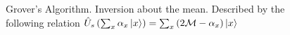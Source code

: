 \begin{figure}
\centering



\caption{Grover's Algorithm. Inversion about the mean. Described by the following relation 
$\hat{U}_s\left(\sum_x \alpha_x \ket{x}\right) = 
\sum_x \left(2 \mathcal{M} - \alpha_x \right)\ket{x}$}
\label{figQuantCompGroverInvMiddle}
\end{figure}
